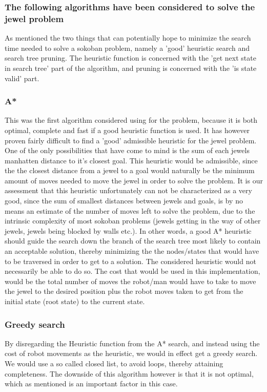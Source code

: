 \subsubsection*{The following algorithms have been considered to solve the jewel problem}
As mentioned the two things that can potentially hope to minimize the search time needed to solve a sokoban problem, namely a 'good' heuristic search and search tree pruning. The heuristic function is concerned with the 'get next state in search tree' part of the algorithm, and pruning is concerned with the 'is state valid' part.

\subsubsection*{A*}
This was the first algorithm considered using for the problem, because it is both optimal, complete and fast if a good heuristic function is used.
It has however proven fairly difficult to find a 'good' admissible heuristic for the jewel problem. One of the only possibilities that have come to mind is the sum of each jewels manhatten distance to it's closest goal. This heuristic would be admissible, since the the closest distance from a jewel to a goal would naturally be the minimum amount of moves needed to move the jewel in order to solve the problem. It is our assessment that this heuristic unfortunately can not be characterized as a very good, since the sum of smallest distances between jewels and goals, is by no means an estimate of the number of moves left to solve the problem, due to the intrinsic complexity of most sokoban problems (jewels getting in the way of other jewels, jewels being blocked by walls etc.). In other words, a good A* heuristic should guide the search down the branch of the search tree most likely to contain an acceptable solution, thereby minimizing the the nodes/states that would have to be traversed in order to get to a solution. The considered heuristic would not necessarily be able to do so.
The cost that would be used in this implementation, would be the total number of moves the robot/man would have to take to move the jewel to the desired position plus the robot moves taken to get from the initial state (root state) to the current state.

\subsubsection*{Greedy search}
By disregarding the Heuristic function from the A* search, and instead using the cost of robot movements as the heuristic, we would in effect get a greedy search. We would use a so called closed list, to avoid loops, thereby attaining completeness. The downside of this algorithm however is that it is not optimal, which as mentioned is an important factor in this case.

